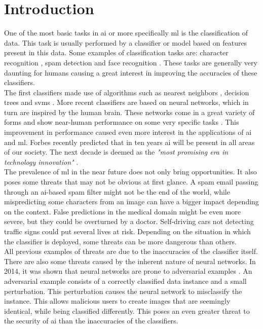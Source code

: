 \chapter{Introduction}
One of the most basic tasks in \gls{ai} or more specifically \gls{ml} is the classification of data. This task is usually performed by a classifier or model based on features present in this data. Some examples of classification tasks are: character recognition \cite{mnist}, spam detection \cite{spambase} and face recognition \cite{face_recognition_survey}. These tasks are generally very daunting for humans causing a great interest in improving the accuracies of these classifiers.\\

The first classifiers made use of algorithms such as nearest neighbors \cite{nearest_neighor}, decision trees \cite{decision_tree} and \glspl{svm} \cite{svm}. More recent classifiers are based on neural networks, which in turn are inspired by the human brain. These networks come in a great variety of forms and show near-human performance on some very specific tasks \cite{alpha_go_google}. This improvement in performance caused even more interest in the applications of \gls{ai} and \gls{ml}. Forbes \cite{forbes} recently predicted that in ten years \gls{ai} will be present in all areas of our society. The next decade is deemed as the \textit{"most promising era in technology innovation"} \cite{forbes}.\\

The prevalence of \gls{ml} in the near future does not only bring opportunities. It also poses some threats that may not be obvious at first glance. A spam email passing through an \gls{ai}-based spam filter might not be the end of the world, while mispredicting some characters from an image can have a bigger impact depending on the context. False predictions in the medical domain might be even more severe, but they could be overturned by a doctor. Self-driving cars not detecting traffic signs could put several lives at risk. Depending on the situation in which the classifier is deployed, some threats can be more dangerous than others.\\

All previous examples of threats are due to the inaccuracies of the classifier itself. There are also some threats caused by the inherent nature of neural networks. In 2014, it was shown that neural networks are prone to adversarial examples \cite{szegedy2014intriguing}. An adversarial example consists of a correctly classified data instance and a small perturbation. This perturbation causes the neural network to misclassify the instance. This allows malicious users to create images that are seemingly identical, while being classified differently. This poses an even greater threat to the security of \gls{ai} than the inaccuracies of the classifiers.\\

